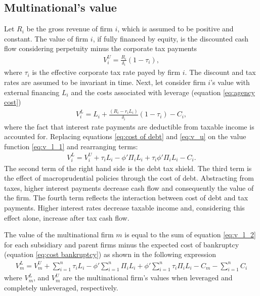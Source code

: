 \documentclass[12pt]{article}
\begin{document}
	\subsection{Multinational's value}
	\label{subsec:value}
	Let $R_i$ be the gross revenue of firm $i$, which is assumed to be positive and constant. The value of firm $i$, if fully financed by equity, is the discounted cash flow considering perpetuity minus the corporate tax payments 
	\begin{equation}
	\begin{aligned}
	V_i^U=\frac{R_i}{\delta_i}(1-\tau_{i}),
	\end{aligned}
	\label{eq:v_u}
	\end{equation}	
	where $\tau_{i}$ is the effective corporate tax rate payed by firm $i$. The discount and tax rates are assumed to be invariant in time. Next, let consider firm $i$'s value with external financing $L_i$ and the costs associated with leverage (equation \ref{eq:agency cost})
	\begin{equation}
	\begin{aligned}
	V_i^L=L_i+\frac{(R_i-r_iL_i)}{\delta_i}(1-\tau_{i})-C_i,
	\end{aligned}
	\label{eq:v_l_1}
	\end{equation}	
	where the fact that interest rate payments are deductible from taxable income is accounted for. Replacing equations \ref{eq:cost of debt} and \ref{eq:v_u} on the value function \ref{eq:v_l_1} and rearranging terms:
	\begin{equation}
	\begin{aligned}
	V_i^L=V_i^U+\tau_{i}L_i-\phi'\Pi_iL_i+\tau_{i}\phi'\Pi_iL_i-C_i.
	\end{aligned}
	\label{eq:v_l_2}
	\end{equation}	
	The second term of the right hand side is the debt tax shield. The third term is the effect of macroprudential policies through the cost of debt. Abstracting from taxes, higher interest payments decrease cash flow and consequently the value of the firm. The fourth term reflects the interaction between cost of debt and tax payments. Higher interest rates decrease taxable income and, considering this effect alone, increase after tax cash flow.
	
	The value of the multinational firm $m$ is equal to the sum of equation \ref{eq:v_l_2} for each subsidiary and parent firms minus the expected cost of bankruptcy (equation \ref{eq:cost bankruptcy}) as shown in the following expression
	\begin{equation}
	\begin{aligned}
	V_m^L=V_m^U+\sum_{i=1}^{n}\tau_iL_i-\phi'\sum_{i=1}^{n}\Pi_iL_i+\phi'\sum_{i=1}^{n}\tau_i\Pi_i L_i-C_m-\sum_{i=1}^{n}C_i
	\end{aligned}
	\label{eq:v_l}
	\end{equation}
	where $V_m^L$, and $V_m^U$ are the multinational firm's values when leveraged and completely unleveraged, respectively.
\end{document}

